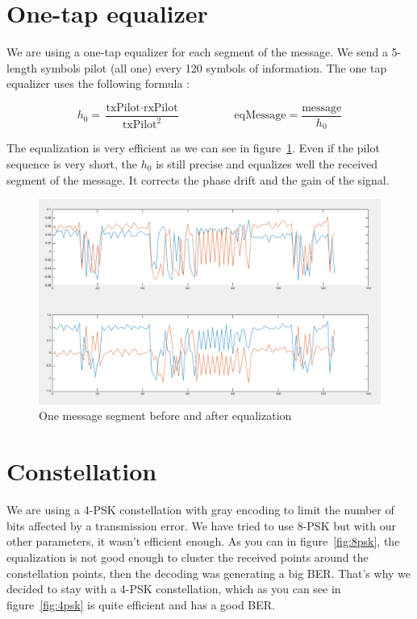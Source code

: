 \documentclass{article}
\begin{document}
\section{One-tap equalizer}

We are using a one-tap equalizer for each segment of the message. We send a 5-length symbols pilot (all one) every 120 symbols of information. The one tap equalizer uses the following formula :

\[
  h_0 = \frac{\text{txPilot} \cdot \text{rxPilot}}{\text{txPilot}^2}
  \hspace{2cm}
  \text{eqMessage} = \frac{\text{message}}{h_0}
\]

The equalization is very efficient as we can see in figure~\ref{fig:eq}. Even if the pilot sequence is very short, the $h_0$ is still precise and equalizes well the received segment of the message. It corrects the phase drift and the gain of the signal. 


\begin{figure}
  \centering\includegraphics[width=\textwidth]{../presentation/eq.png}
  \caption{One message segment before and after equalization}
  \label{fig:eq}
\end{figure}

\section{Constellation}

We are using a 4-PSK constellation with gray encoding to limit the number of bits affected by a transmission error. We have tried to use 8-PSK but with our other parameters, it wasn't efficient enough. As you can in figure~\ref{fig:8psk}, the equalization is not good enough to cluster the received points around the constellation points, then the decoding was generating a big BER. That's why we decided to stay with a 4-PSK constellation, which as you can see in figure~\ref{fig:4psk} is quite efficient and has a good BER.
\end{document}
